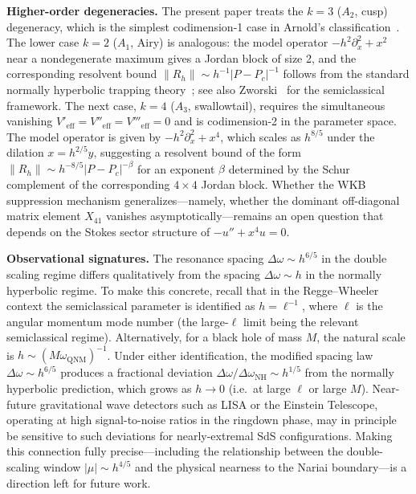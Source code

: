 \documentclass[12pt,a4paper]{amsart}
\theoremstyle{remark}
\begin{document}
\textbf{Higher-order degeneracies.}
The present paper treats the $k=3$ ($A_2$, cusp) degeneracy, which is the simplest
codimension-1 case in Arnold's classification~\cite{Arnold72}.
The lower case $k=2$ ($A_1$, Airy) is analogous: the model operator $-h^2\partial_x^2 + x^2$
near a nondegenerate maximum gives a Jordan block of size 2, and the corresponding
resolvent bound $\|R_h\| \sim h^{-1}|P-P_c|^{-1}$ follows from the standard
normally hyperbolic trapping theory~\cite{WZ11,NZ15};
see also Zworski~\cite{Zworski2012} for the semiclassical framework.
The next case, $k=4$ ($A_3$, swallowtail), requires the simultaneous vanishing
$V'_{\mathrm{eff}} = V''_{\mathrm{eff}} = V'''_{\mathrm{eff}} = 0$ and is
codimension-2 in the parameter space.
The model operator is given by $-h^2\partial_x^2 + x^4$, which scales as $h^{8/5}$ under
the dilation $x = h^{2/5}y$, suggesting a resolvent bound of the form
$\|R_h\| \sim h^{-8/5}|P-P_c|^{-\beta}$ for an exponent $\beta$ determined
by the Schur complement of the corresponding $4\times 4$ Jordan block.
Whether the WKB suppression mechanism generalizes---namely, whether the dominant
off-diagonal matrix element $X_{41}$ vanishes asymptotically---remains an open
question that depends on the Stokes sector structure of $-u'' + x^4 u = 0$.

\textbf{Observational signatures.}
The resonance spacing $\Delta\omega \sim h^{6/5}$ in the double scaling regime
differs qualitatively from the spacing $\Delta\omega \sim h$ in the normally
hyperbolic regime. To make this concrete, recall that in the Regge--Wheeler
context the semiclassical parameter is identified as $h = \ell^{-1}$, where
$\ell$ is the angular momentum mode number (the large-$\ell$ limit being the
relevant semiclassical regime). Alternatively, for a black hole of mass $M$, the
natural scale is $h \sim (M\omega_{\mathrm{QNM}})^{-1}$.
Under either identification, the modified spacing law $\Delta\omega \sim h^{6/5}$
produces a fractional deviation $\Delta\omega/\Delta\omega_{\mathrm{NH}} \sim h^{1/5}$
from the normally hyperbolic prediction, which grows as $h \to 0$ (i.e.\ at large
$\ell$ or large $M$). Near-future gravitational wave detectors such as LISA or the
Einstein Telescope, operating at high signal-to-noise ratios in the ringdown phase,
may in principle be sensitive to such deviations for nearly-extremal SdS configurations.
Making this connection fully precise---including the relationship between the
double-scaling window $|\mu| \sim h^{4/5}$ and the physical nearness to the Nariai
boundary---is a direction left for future work.
\end{document}
